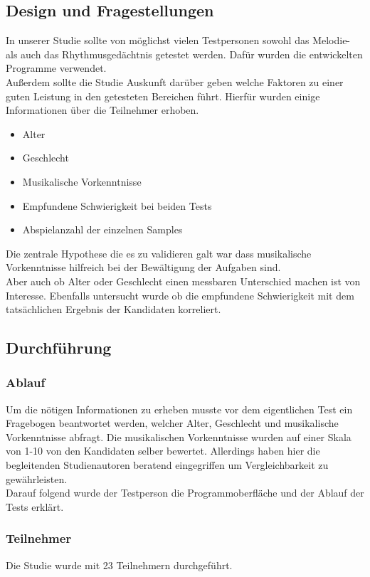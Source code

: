 \documentclass{acm_proc_article-sp}
\begin{document}
\subsection{Design und Fragestellungen}
In unserer Studie sollte von möglichst vielen Testpersonen sowohl das Melodie- als auch das Rhythmusgedächtnis getestet werden. Dafür wurden die entwickelten Programme verwendet.\\
Außerdem sollte die Studie Auskunft darüber geben welche Faktoren zu einer guten Leistung in den getesteten Bereichen führt. Hierfür wurden einige Informationen über die Teilnehmer erhoben.\\
\begin{itemize} 
\item Alter
\item Geschlecht
\item Musikalische Vorkenntnisse
\item Empfundene Schwierigkeit bei beiden Tests
\item Abspielanzahl der einzelnen Samples
\end{itemize}
Die zentrale Hypothese die es zu validieren galt war dass musikalische Vorkenntnisse hilfreich bei der Bewältigung der Aufgaben sind. \\
Aber auch ob Alter oder Geschlecht einen messbaren Unterschied machen ist von Interesse. Ebenfalls untersucht wurde ob die empfundene Schwierigkeit mit dem tatsächlichen Ergebnis der Kandidaten korreliert. 

\subsection{Durchführung}

\subsubsection{Ablauf}
Um die nötigen Informationen zu erheben musste vor dem eigentlichen Test ein Fragebogen beantwortet werden, welcher Alter, Geschlecht und musikalische Vorkenntnisse abfragt. Die musikalischen Vorkenntnisse wurden auf einer Skala von 1-10 von den Kandidaten selber bewertet. Allerdings haben hier die begleitenden Studienautoren beratend eingegriffen um Vergleichbarkeit zu gewährleisten.\\
Darauf folgend wurde der Testperson die Programmoberfläche und der Ablauf der Tests erklärt. \\
\subsubsection{Teilnehmer}
Die Studie wurde mit 23 Teilnehmern durchgeführt. 
\end{document}
